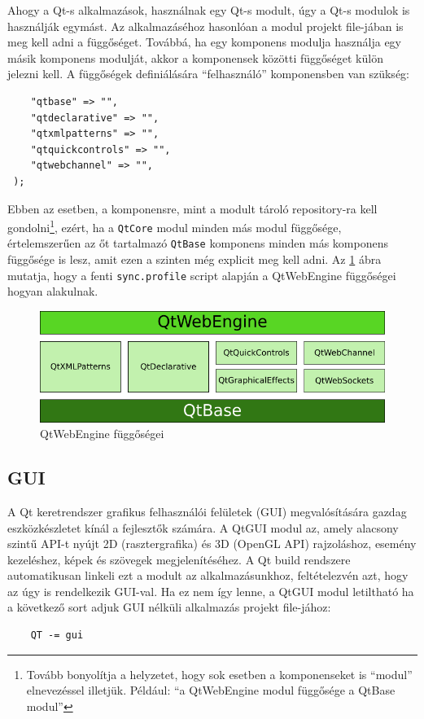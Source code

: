 \documentclass[12pt]{report}
\begin{document}
Ahogy a Qt-s alkalmazások, használnak egy Qt-s modult, úgy a Qt-s modulok is használják
egymást. Az alkalmazáséhoz hasonlóan a modul projekt file-jában is meg kell adni a
függőséget. Továbbá, ha egy komponens modulja használja egy másik komponens modulját, akkor
a komponensek közötti függőséget külön jelezni kell. A függőségek definiálására
``felhasználó'' komponensben van szükség:
\begin{lstlisting}[title=sync.profile]
 %dependencies = (
    "qtbase" => "",
    "qtdeclarative" => "",
    "qtxmlpatterns" => "",
    "qtquickcontrols" => "",
    "qtwebchannel" => "",
 );
\end{lstlisting}

\noindent
Ebben az esetben, a komponensre, mint a modult tároló repository-ra kell
gondolni\footnote{Tovább bonyolítja a helyzetet, hogy sok esetben a komponenseket is
``modul'' elnevezéssel illetjük. Például: ``a QtWebEngine modul függősége a QtBase modul''},
ezért, ha a \texttt{QtCore} modul minden más modul függősége, értelemszerűen az őt tartalmazó
\texttt{QtBase} komponens minden más komponens függősége is lesz, amit ezen a szinten
még explicit meg kell adni.
Az \ref{fig:qtwebengine-dependencies} ábra mutatja, hogy a fenti \texttt{sync.profile} script
alapján a QtWebEngine függőségei hogyan alakulnak.

\begin{figure}[ht]
    \centering
    \includegraphics[scale=.66]{qtwebengine-dependencies}
    \caption{
        \label{fig:qtwebengine-dependencies}
        QtWebEngine függőségei
    }
\end{figure}

\subsection{GUI}
\label{sec:qt-gui}
A Qt keretrendszer grafikus felhasználói felületek (GUI) megvalósítására gazdag
eszközkészletet kínál a fejlesztők számára. A QtGUI modul az, amely alacsony szintű API-t
nyújt 2D (rasztergrafika) és 3D (OpenGL API) rajzoláshoz, esemény kezeléshez, képek és
szövegek megjelenítéséhez. A Qt build rendszere automatikusan linkeli ezt a modult az
alkalmazásunkhoz, feltételezvén azt, hogy az úgy is rendelkezik GUI-val. Ha ez nem így
lenne, a QtGUI modul letiltható ha a következő sort adjuk GUI nélküli alkalmazás
projekt file-jához:
\begin{verbatim}
    QT -= gui
\end{verbatim}
\end{document}

